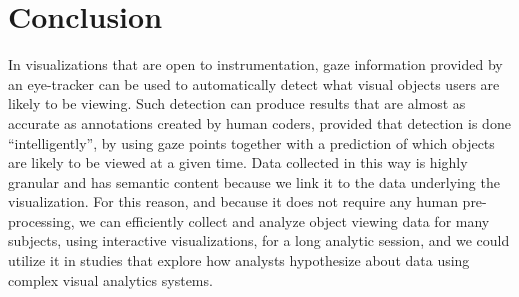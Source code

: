 
\section{Conclusion}
\label{sec:DOICollectionConclusion}
In visualizations that are open to instrumentation, gaze information provided by an eye-tracker can be used to automatically detect what visual objects users are likely to be viewing. Such detection can produce results that are almost as accurate as annotations created by human coders, provided that detection is done ``intelligently'', by using gaze points together with a prediction of which objects are likely to be viewed at a given time. Data collected in this way is highly granular and has semantic content because we link it to the data underlying the visualization. For this reason, and because it does not require any human pre-processing, we can efficiently collect and analyze object viewing data for many subjects, using interactive visualizations, for a long analytic session, and we could utilize it in studies that explore how analysts hypothesize about data using complex visual analytics systems. 